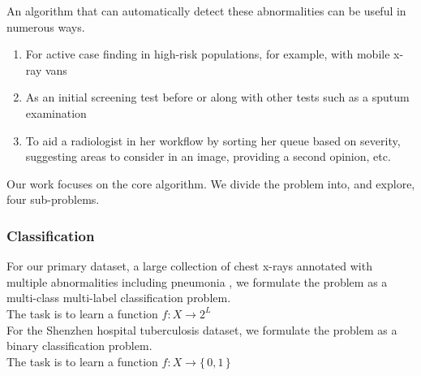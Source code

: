 \documentclass[8pt]{beamer}
\begin{document}
  \begin{frame}
    An algorithm that can automatically detect these abnormalities can be useful
    in numerous ways.\\ \pause \vspace{\baselineskip}
    \begin{enumerate}
    \item{For active case finding in high-risk populations, for example, with
        mobile x-ray vans\cite{modi_suresh_2019}}\pause
    \item{As an initial screening test before or along with other tests such as
        a sputum examination}\pause
    \item{To aid a radiologist in her workflow by sorting her queue based on
        severity, suggesting areas to consider in an image, providing a second
        opinion, etc.}\pause
    \end{enumerate}

    \vspace{\baselineskip}
    
    Our work focuses on the core algorithm. We divide the problem into, and
    explore, four sub-problems.


  \end{frame}

  \begin{frame}

    \frametitle{Classification} For our primary dataset, a large collection of
    chest x-rays annotated with multiple abnormalities including pneumonia
    \cite{Wang2017a}, we formulate the problem as a multi-class multi-label
    classification problem.\pause \\
    \vspace{\baselineskip} The task is to learn a function $f:X \rightarrow 2^L$
    \\ \pause \vspace{\baselineskip}
    For the Shenzhen hospital tuberculosis dataset\cite{jaeger2014two}, we formulate the problem as a binary classification problem. \\
    \pause \vspace{\baselineskip} The task is to learn a function $f:X
    \rightarrow \{\,0, 1 \,\}$

  \end{frame}
\end{document}

